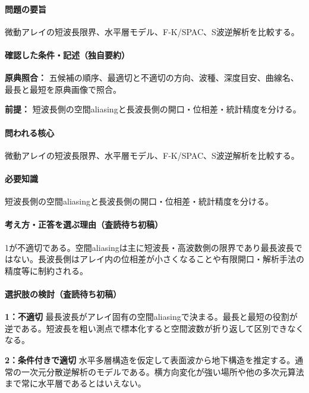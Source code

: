 \paragraph{問題の要旨} 微動アレイの短波長限界、水平層モデル、F-K/SPAC、S波逆解析を比較する。

\paragraph{確認した条件・記述（独自要約）}\mbox{}\par

\noindent\textbf{原典照合：} 五候補の順序、最適切と不適切の方向、波種、深度目安、曲線名、最長と最短を原典画像で照合。\par

\noindent\textbf{前提：} 短波長側の空間aliasingと長波長側の開口・位相差・統計精度を分ける。\par

\paragraph{問われる核心} 微動アレイの短波長限界、水平層モデル、F-K/SPAC、S波逆解析を比較する。

\paragraph{必要知識} 短波長側の空間aliasingと長波長側の開口・位相差・統計精度を分ける。

\paragraph{考え方・正答を選ぶ理由（査読待ち初稿）} 1が不適切である。空間aliasingは主に短波長・高波数側の限界であり最長波長ではない。長波長側はアレイ内の位相差が小さくなることや有限開口・解析手法の精度等に制約される。

\paragraph{選択肢の検討（査読待ち初稿）}\mbox{}\par

\noindent\textbf{1：不適切} 最長波長がアレイ固有の空間aliasingで決まる。最長と最短の役割が逆である。短波長を粗い測点で標本化すると空間波数が折り返して区別できなくなる。\par

\noindent\textbf{2：条件付きで適切} 水平多層構造を仮定して表面波から地下構造を推定する。通常の一次元分散逆解析のモデルである。横方向変化が強い場所や他の多次元算法まで常に水平層であるとはいえない。\par

